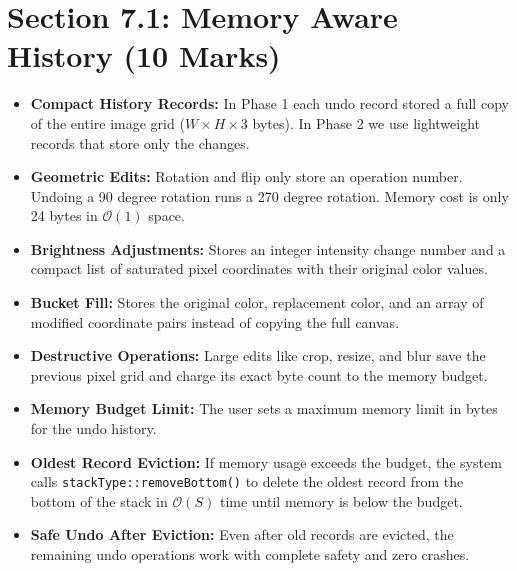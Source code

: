 \documentclass[10pt,a4paper]{article}
\begin{document}
\section{Section 7.1: Memory Aware History (10 Marks)}
\begin{itemize}
    \item \textbf{Compact History Records:} In Phase 1 each undo record stored a full copy of the entire image grid ($W \times H \times 3$ bytes). In Phase 2 we use lightweight records that store only the changes.
    \item \textbf{Geometric Edits:} Rotation and flip only store an operation number. Undoing a 90 degree rotation runs a 270 degree rotation. Memory cost is only 24 bytes in $\mathcal{O}(1)$ space.
    \item \textbf{Brightness Adjustments:} Stores an integer intensity change number and a compact list of saturated pixel coordinates with their original color values.
    \item \textbf{Bucket Fill:} Stores the original color, replacement color, and an array of modified coordinate pairs instead of copying the full canvas.
    \item \textbf{Destructive Operations:} Large edits like crop, resize, and blur save the previous pixel grid and charge its exact byte count to the memory budget.
    \item \textbf{Memory Budget Limit:} The user sets a maximum memory limit in bytes for the undo history.
    \item \textbf{Oldest Record Eviction:} If memory usage exceeds the budget, the system calls \texttt{stackType::removeBottom()} to delete the oldest record from the bottom of the stack in $\mathcal{O}(S)$ time until memory is below the budget.
    \item \textbf{Safe Undo After Eviction:} Even after old records are evicted, the remaining undo operations work with complete safety and zero crashes.
\end{itemize}
\end{document}
